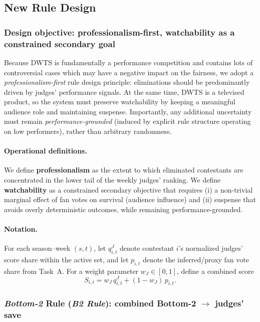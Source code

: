 \subsection{New Rule Design}
\label{subsec:task_d2}

\subsubsection{Design objective: professionalism-first, watchability as a constrained secondary goal}
\label{subsubsec:d2_objective}

Because DWTS is fundamentally a performance competition and contains lots of controversial cases which may have a negative impact on the fairness, we adopt a \emph{professionalism-first} rule design principle:
eliminations should be predominantly driven by judges' performance signals. At the same time, DWTS is a televised product,
so the system must preserve watchability by keeping a meaningful audience role and maintaining suspense.
Importantly, any additional uncertainty must remain \emph{performance-grounded} (induced by explicit rule structure operating on low performers),
rather than arbitrary randomness.

\paragraph{Operational definitions.}
We define \textbf{professionalism} as the extent to which eliminated contestants are concentrated in the lower tail of the weekly judges' ranking.
We define \textbf{watchability} as a constrained secondary objective that requires (i) a non-trivial marginal effect of fan votes on survival
(audience influence) and (ii) suspense that avoids overly deterministic outcomes, while remaining performance-grounded.

\paragraph{Notation.}
For each season--week $(s,t)$, let $q^J_{i,t}$ denote contestant $i$'s normalized judges' score share within the active set,
and let $p_{i,t}$ denote the inferred/proxy fan vote share from Task~A.
For a weight parameter $w_J\in[0,1]$, define a combined score
\[
S_{i,t}=w_J\,q^J_{i,t} + (1-w_J)\,p_{i,t}.
\]


\subsubsection{\textit{Bottom-2} Rule (\textit{B2 Rule}): combined Bottom-2 $\rightarrow$ judges' save}
\label{subsubsec:d2_ruleA}

